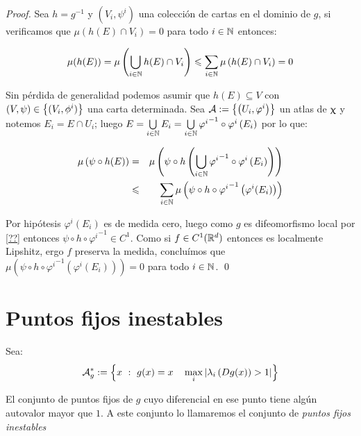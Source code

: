 \begin{proof}
	Sea $h = g^{-1}$ y $\left(V_i, \psi^i\right)$ una colecci\'on de cartas en el dominio de $g$, si verificamos que $\mu\left(h\left(E\right) \cap V_i\right) = 0$ para todo $i \in {\mathbb{N}}$ entonces:
	
	\begin{equation*}
	\mu(h(E)) = \mu \left(\bigcup\limits_{i \in {\mathbb{N}}}{h(E) \cap V_i}\right) \leqslant \sum\limits_{i \in {\mathbb{N}}}{\mu} \left(h(E) \cap V_i\right) = 0
	\end{equation*}
	
	Sin p\'erdida de generalidad podemos asumir que $h(E) \subseteq V$ con $(V, \psi) \in \left\lbrace(V_i, \phi^i)\right\rbrace$ una carta determinada. Sea $\mathcal{A} := \left\lbrace\left(U_i, \varphi^i \right)\right\rbrace$ un atlas de $\upchi$ y notemos $E_i = E \cap U_i$; luego $E = \bigcup\limits_{i \in {\mathbb{N}}}{E_i} = \bigcup\limits_{i \in {\mathbb{N}}}{{\varphi^i}^{-1} \circ \varphi^{i} \left(E_i\right)}$ por lo que:
	
	\begin{equation*}
	\begin{aligned}
	\mu\left(\psi \circ h(E)\right) & = & \mu \left(\psi \circ h \left(\bigcup\limits_{i \in {\mathbb{N}}}{{\varphi^i}^{-1} \circ \varphi^{i} \left(E_i\right)}\right)\right)\\
	& \leqslant & \sum\limits_{i \in {\mathbb{N}}}{\mu \left(\psi \circ h \circ {\varphi^{i}}^{-1} \left(\varphi^i (E_i)\right)\right)}
	\end{aligned}
	\end{equation*}
	
	
	Por hip\'otesis $\varphi^i(E_i)$ es de medida cero, luego como $g$ es difeomorfismo local por \ref{??} entonces $\psi \circ h \circ {\varphi^{i}}^{-1} \in C^1$. Como si $f \in C^1({\mathbb{R}}^d)$ entonces  es localmente Lipshitz, ergo $f$ preserva la medida, conclu\'imos que ${\mu \left(\psi \circ h \circ {\varphi^{i}}^{-1} \left(\varphi^i (E_i)\right)\right)} = 0$ para todo $i \in {\mathbb{N}}$. \qed
	
\end{proof}

\section{Puntos fijos inestables}

\begin{definition}
	Sea:
	\begin{equation*}
	\label{def:punto fijo inestable de g}
	\mathcal{A}_{g}^{*} := \left\lbrace x \ : \ g(x) = x \quad \max\limits_{i}\left\lvert\lambda_i \left(Dg(x)\right) > 1\right\rvert\right\rbrace
	\end{equation*}
	
	El conjunto de puntos fijos de $g$ cuyo diferencial en ese punto tiene alg\'un autovalor mayor que $1$. A este conjunto lo llamaremos el conjunto de \textit{puntos fijos inestables}
	
\end{definition}

